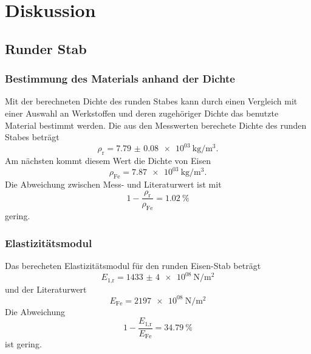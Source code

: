 \section{Diskussion}
\label{sec:Diskussion}

\subsection{Runder Stab}

\subsubsection{Bestimmung des Materials anhand der Dichte}

Mit der berechneten Dichte des runden Stabes kann durch einen
Vergleich mit einer Auswahl an Werkstoffen und deren zugehöriger
Dichte \cite{Metallwerte} das benutzte Material bestimmt werden.
Die aus den Messwerten berechete Dichte des runden Stabes beträgt
\begin{equation}
  \rho_\text{r} = \SI{7.79(8)e03}{\kilo\gram\per\cubic\meter}.
\end{equation}
Am nächsten kommt diesem Wert die Dichte von Eisen \cite{Metallwerte}
\begin{equation}
  \rho_\text{Fe} = \SI{7.87e03}{\kilo\gram\per\cubic\meter}.
\end{equation}
Die Abweichung zwischen Mess- und Literaturwert ist mit
\begin{equation}
  1-\frac{\rho_\text{r}}{\rho_\text{Fe}} = \SI{1.02}{\percent}
\end{equation}
gering.

\subsubsection{Elastizitätsmodul}

Das berecheten Elastizitätsmodul für den runden Eisen-Stab beträgt
\begin{equation}
  E_\text{1,r} = \SI{1433(4)e08}{\newton\per\meter\squared}
\end{equation}
und der Literaturwert \cite{Metallwerte}
\begin{equation}
  E_\text{Fe} = \SI{2197e08}{\newton\per\meter\squared}
\end{equation}
Die Abweichung
\begin{equation}
  1-\frac{E_\text{1,r}}{E_\text{Fe}} = \SI{34.79}{\percent}
\end{equation}
ist gering.

